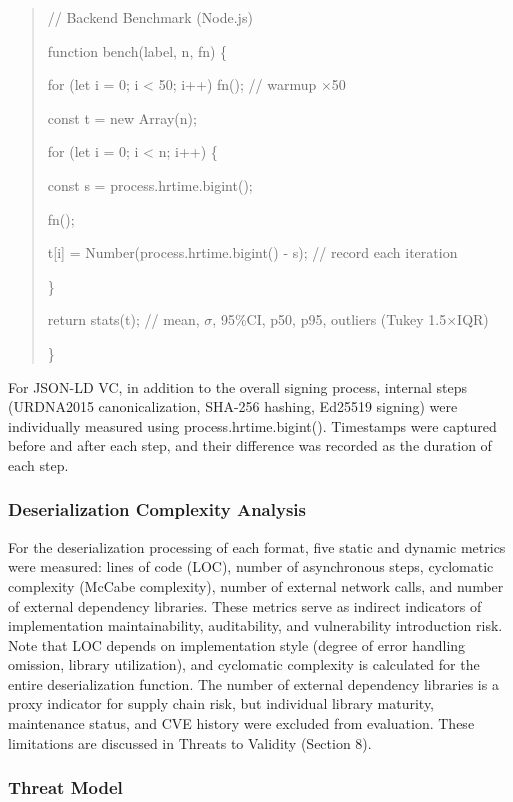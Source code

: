 \documentclass[conference]{IEEEtran}
\begin{document}
\begin{quote}
// Backend Benchmark (Node.js)

function bench(label, n, fn) \{

for (let i = 0; i \textless{} 50; i++) fn(); // warmup $\times$50

const t = new Array(n);

for (let i = 0; i \textless{} n; i++) \{

const s = process.hrtime.bigint();

fn();

t{[}i{]} = Number(process.hrtime.bigint() - s); // record each iteration

\}

return stats(t); // mean, $\sigma$, 95\%CI, p50, p95, outliers (Tukey 1.5$\times$IQR)

\}
\end{quote}

For JSON-LD VC, in addition to the overall signing process, internal steps (URDNA2015 canonicalization, SHA-256 hashing, Ed25519 signing) were individually measured using process.hrtime.bigint(). Timestamps were captured before and after each step, and their difference was recorded as the duration of each step.

\subsubsection{Deserialization Complexity Analysis}

For the deserialization processing of each format, five static and dynamic metrics were measured: lines of code (LOC), number of asynchronous steps, cyclomatic complexity (McCabe complexity), number of external network calls, and number of external dependency libraries. These metrics serve as indirect indicators of implementation maintainability, auditability, and vulnerability introduction risk. Note that LOC depends on implementation style (degree of error handling omission, library utilization), and cyclomatic complexity is calculated for the entire deserialization function. The number of external dependency libraries is a proxy indicator for supply chain risk, but individual library maturity, maintenance status, and CVE history were excluded from evaluation. These limitations are discussed in Threats to Validity (Section 8).

\subsubsection{Threat Model}
\end{document}
